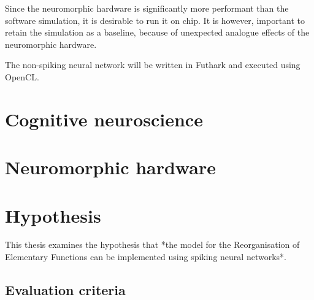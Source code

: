 \documentclass[report.tex]{subfiles}
\begin{document}
Since the neuromorphic hardware is significantly more performant than the software simulation, it is desirable to run it on chip.
It is however, important to retain the simulation as a baseline, because of unexpected analogue effects of the neuromorphic hardware.

The non-spiking neural network will be written in Futhark and executed using OpenCL.
\section{Cognitive neuroscience}
\section{Neuromorphic hardware}
\section{Hypothesis} \label{sec:hypothesis}
This thesis examines the hypothesis that *the model for the Reorganisation of Elementary Functions can be implemented using spiking neural networks*.
\subsection{Evaluation criteria} \label{sec:hypothesis-criteria}
\end{document}
